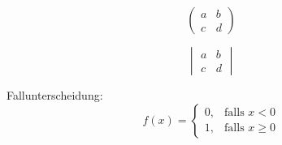 \begin{equation}
	\begin{pmatrix} 
		a&b\\
		c&d 
	\end{pmatrix}
\end{equation} 

\begin{equation}
	\begin{vmatrix} 
		a&b\\
		c&d 
	\end{vmatrix}
\end{equation} 

Fallunterscheidung:
\begin{equation}
	f(x) = 
	\begin{cases}
		0, &\text{falls } x < 0 \\
		1, &\text{falls } x \geq 0
	\end{cases}
\end{equation}



